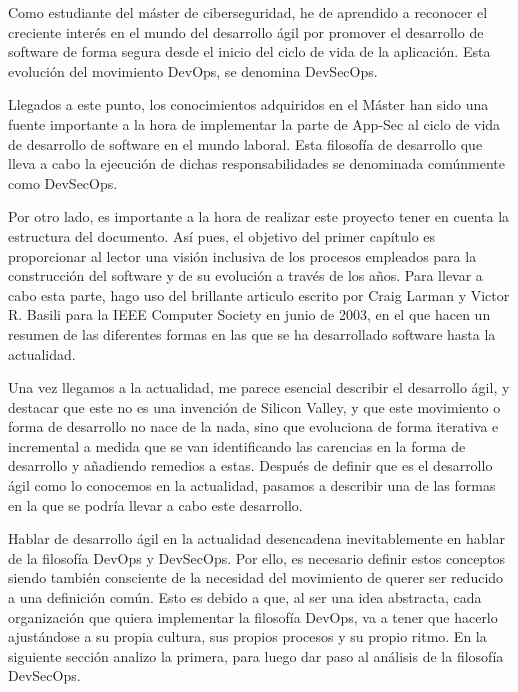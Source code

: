 \documentclass[12pt]{report} %
\begin{document}
Como estudiante del máster de ciberseguridad, he de aprendido a reconocer el
creciente interés en el mundo del desarrollo ágil por promover el desarrollo de
software de forma segura desde el inicio del ciclo de vida de la aplicación.
Esta evolución del movimiento DevOps, se denomina DevSecOps.
 
Llegados a este punto, los conocimientos adquiridos en el Máster han sido una
fuente importante a la hora de implementar la parte de \gls{App-Sec} al ciclo de
vida de desarrollo de software en el mundo laboral. Esta filosofía de desarrollo
que lleva a cabo la ejecución de dichas responsabilidades se denominada
comúnmente como \gls{DevSecOps}.


Por otro lado, es importante a la hora de realizar este proyecto tener en cuenta
la estructura del documento. Así pues, el objetivo del primer capítulo es
proporcionar al lector una visión inclusiva de los procesos empleados para la
construcción del software y de su evolución a través de los años.  Para llevar a
cabo esta parte, hago uso del brillante articulo escrito por Craig Larman y
Victor R. Basili para la IEEE Computer Society en junio de 2003, en el que hacen
un resumen de las diferentes formas en las que se ha desarrollado software hasta
la actualidad.

Una vez llegamos a la actualidad, me parece esencial describir el desarrollo
ágil, y destacar que este no es una invención de Silicon Valley, y que este
movimiento o forma de desarrollo no nace de la nada, sino que evoluciona de
forma iterativa e incremental a medida que se van identificando las carencias en
la forma de desarrollo y añadiendo remedios a estas.  Después de definir que es
el desarrollo ágil como lo conocemos en la actualidad, pasamos a describir una
de las formas en la que se podría llevar a cabo este desarrollo. 

Hablar de desarrollo ágil en la actualidad desencadena inevitablemente en hablar
de la filosofía \gls{DevOps} y \gls{DevSecOps}. Por ello, es necesario definir
estos conceptos siendo también consciente de la necesidad del movimiento de
querer ser reducido a una definición común.  Esto es debido a que, al ser una
idea abstracta, cada organización que quiera implementar la filosofía DevOps, va
a tener que hacerlo ajustándose a su propia cultura, sus propios procesos y su
propio ritmo.  En la siguiente sección analizo la primera, para luego dar paso
al análisis de la filosofía \gls{DevSecOps}.
\end{document}
